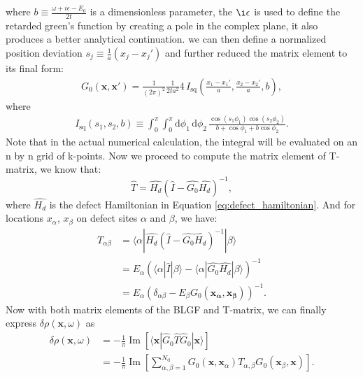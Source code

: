 where $b \equiv \frac{\omega+ i\epsilon-E_0}{2t}$ is a dimensionless parameter, the $\i\epsilon$ is used to define the retarded green's function by creating a pole in the complex plane, it also produces a better analytical continuation. we can then define a normalized position deviation $s_j \equiv \frac{1}{a}(x_j-x_j')$ and further reduced the matrix element to its final form: 
\begin{align}
	G_0(\mathbf{x}, \mathbf{x}') = 
	\frac{1}{(2\pi)^2} \frac{1}{2t a^2} 4 \, I_{\text{sq}} 
	\left( \frac{x_1 - x_1'}{a}, \frac{x_2 - x_2'}{a}, b \right) \label{blgf},
\end{align}
where
\begin{align}
	I_{\text{sq}}(s_1, s_2, b) \equiv 
	\int_0^\pi \int_0^\pi \mathrm{d}\phi_1 \, \mathrm{d}\phi_2 \, 
	\frac{\cos(s_1 \phi_1) \cos(s_2 \phi_2)}{b + \cos\phi_1 +b  \cos\phi_2} \label{Isq}.
\end{align}
Note that in the actual numerical calculation, the integral will be evaluated on an n by n grid of k-points.  
Now we proceed to compute the matrix element of T-matrix, we know that: 
\begin{equation}
	\hat{T} = \hat{H_d} (\hat{I} - \hat{G_0}\hat{H_d})^{-1},
\end{equation} 
where $\hat{H_d}$ is the defect Hamiltonian in Equation \ref{eq:defect_hamiltonian}. And for locations $x_\alpha$, $x_\beta$ on defect sites $\alpha$ and $\beta$, we have: 
\begin{align}
	T_{\alpha\beta} &= \langle \alpha|\hat{H_d} (\hat{I} - \hat{G_0}\hat{H_d})^{-1} | \beta\rangle \\
	&= E_\alpha(\langle \alpha|\hat{I}|\beta\rangle - \langle \alpha|\hat{G_0}\hat{H_d}|\beta \rangle)^{-1} \\
	&= E_\alpha(\delta_{\alpha \beta} - E_\beta G_0(\mathbf{x_\alpha},\mathbf{x_\beta}))^{-1} \label{T_matrix_ele}.
\end{align}
Now with both matrix elements of the \ac{BLGF} and T-matrix, we can finally express $\delta\rho(\mathbf{x},\omega)$ as 
\begin{align}
	\delta\rho(\mathbf{x},\omega) &= - \frac{1}{\pi} \operatorname{Im} \left[ \langle \mathbf{x} | \hat{G}_0 \hat{T} \hat{G}_0 | \mathbf{x} \rangle \right] \\
	&= -\frac{1}{\pi} \operatorname{Im} \left[\sum_{\alpha, \beta=1}^{N_{\text{d}}} G_0(\mathbf{x}, \mathbf{x}_\alpha) T_{\alpha, \beta} G_0(\mathbf{x}_\beta, \mathbf{x})\right]. \label{multi_defect_eq}
\end{align}
